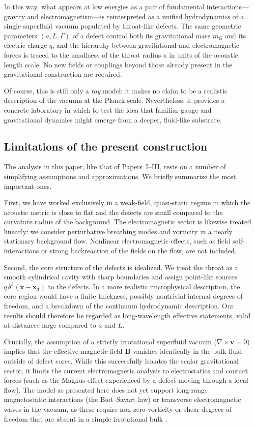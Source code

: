 \documentclass[11pt]{article}
\begin{document}
In this way, what appears at low energies as a pair of fundamental interactions---gravity and electromagnetism---is reinterpreted as a unified hydrodynamics of a single superfluid vacuum populated by throat-like defects.  The same geometric parameters $(a,L,\Gamma)$ of a defect control both its gravitational mass $m_G$ and its electric charge $q$, and the hierarchy between gravitational and electromagnetic forces is traced to the smallness of the throat radius $a$ in units of the acoustic length scale.  No new fields or couplings beyond those already present in the gravitational construction are required.

Of course, this is still only a \emph{toy} model: it makes no claim to be a realistic description of the vacuum at the Planck scale.  Nevertheless, it provides a concrete laboratory in which to test the idea that familiar gauge and gravitational dynamics might emerge from a deeper, fluid-like substrate.

\subsection{Limitations of the present construction}

The analysis in this paper, like that of Papers~I--III, rests on a number of simplifying assumptions and approximations.  We briefly summarize the most important ones.

First, we have worked exclusively in a weak-field, quasi-static regime in which the acoustic metric is close to flat and the defects are small compared to the curvature radius of the background.  The electromagnetic sector is likewise treated linearly: we consider perturbative breathing modes and vorticity in a nearly stationary background flow.  Nonlinear electromagnetic effects, such as field self-interactions or strong backreaction of the fields on the flow, are not included.

Second, the core structure of the defects is idealized.  We treat the throat as a smooth cylindrical cavity with sharp boundaries and assign point-like sources $q\,\delta^3(\mathbf{x}-\mathbf{x}_d)$ to the defects.  In a more realistic microphysical description, the core region would have a finite thickness, possibly nontrivial internal degrees of freedom, and a breakdown of the continuum hydrodynamic description.  Our results should therefore be regarded as long-wavelength effective statements, valid at distances large compared to $a$ and $L$.

Crucially, the assumption of a strictly irrotational superfluid vacuum ($\nabla \times \mathbf{v} = 0$) implies that the effective magnetic field $\mathbf{B}$ vanishes identically in the bulk fluid outside of defect cores.  While this successfully isolates the scalar gravitational sector, it limits the current electromagnetic analysis to electrostatics and contact forces (such as the Magnus effect experienced by a defect moving through a local flow).  The model as presented here does not yet support long-range magnetostatic interactions (the Biot--Savart law) or transverse electromagnetic waves in the vacuum, as these require non-zero vorticity or shear degrees of freedom that are absent in a simple irrotational bulk \cite{Norris:Paper3,Norris:Paper2}.
\end{document}
